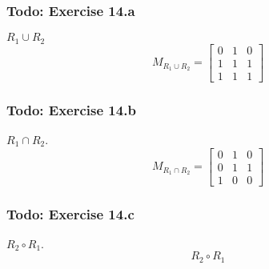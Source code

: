\documentclass[12pt]{article}
\begin{document}
    \subsubsection{Todo: Exercise 14.a}
    $R_1 \cup R_2$
    \begin{equation}
        M_{R_1 \cup R_2} = \begin{bmatrix}
            0 & 1 & 0 \\
            1 & 1 & 1 \\
            1 & 1 & 1
        \end{bmatrix}
    \end{equation}

    \subsubsection{Todo: Exercise 14.b}
    $ R_1 \cap R_2 $.
    \begin{equation}
        M_{ R_1 \cap R_2}=
        \begin{bmatrix}
            0 & 1 & 0\\
            0 & 1 & 1\\
            1 & 0 & 0
        \end{bmatrix}
    \end{equation}
    
    \subsubsection{Todo: Exercise 14.c}
    $ R_2 \circ R_1$.
    \begin{equation}
        R_2 \circ R_1
    \end{equation}
\end{document}
